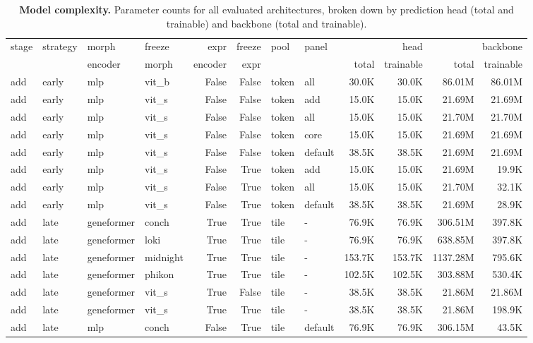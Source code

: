 \begin{table}
  \small
  \caption{\textbf{Model complexity.} Parameter counts for all evaluated architectures, broken down by prediction head (total and trainable) and backbone (total and trainable).}
  \label{tab:p-fus:model-complexity}

\begin{tabular}{llllrrllrrrr}
\toprule
stage & strategy & morph & freeze & expr & freeze & pool & panel & \multicolumn{2}{r}{head} & \multicolumn{2}{r}{backbone} \\
 &  & encoder & morph & encoder & expr &  &  & total & trainable & total & trainable \\
\midrule
add & early & mlp & vit\_b & False & False & token & all & 30.0K & 30.0K & 86.01M & 86.01M \\
add & early & mlp & vit\_s & False & False & token & add & 15.0K & 15.0K & 21.69M & 21.69M \\
add & early & mlp & vit\_s & False & False & token & all & 15.0K & 15.0K & 21.70M & 21.70M \\
add & early & mlp & vit\_s & False & False & token & core & 15.0K & 15.0K & 21.69M & 21.69M \\
add & early & mlp & vit\_s & False & False & token & default & 38.5K & 38.5K & 21.69M & 21.69M \\
add & early & mlp & vit\_s & False & True & token & add & 15.0K & 15.0K & 21.69M & 19.9K \\
add & early & mlp & vit\_s & False & True & token & all & 15.0K & 15.0K & 21.70M & 32.1K \\
add & early & mlp & vit\_s & False & True & token & default & 38.5K & 38.5K & 21.69M & 28.9K \\
add & late & geneformer & conch & True & True & tile & - & 76.9K & 76.9K & 306.51M & 397.8K \\
add & late & geneformer & loki & True & True & tile & - & 76.9K & 76.9K & 638.85M & 397.8K \\
add & late & geneformer & midnight & True & True & tile & - & 153.7K & 153.7K & 1137.28M & 795.6K \\
add & late & geneformer & phikon & True & True & tile & - & 102.5K & 102.5K & 303.88M & 530.4K \\
add & late & geneformer & vit\_s & True & False & tile & - & 38.5K & 38.5K & 21.86M & 21.86M \\
add & late & geneformer & vit\_s & True & True & tile & - & 38.5K & 38.5K & 21.86M & 198.9K \\
add & late & mlp & conch & False & True & tile & default & 76.9K & 76.9K & 306.15M & 43.5K \\

\end{tabular}
\end{table}
